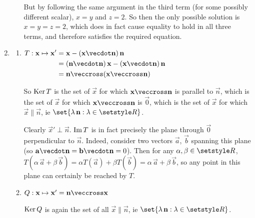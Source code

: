 \documentclass[fleqn,a4paper,11pt]{article}
\begin{document}
\begin{enumerate}[label=\textbf{\arabic*.}]
\begin{enumerate}[label=(\alph*)]
      But by following the same argument in the third term (for some possibly
      different scalar), \(x = y\) and \(z = 2\). So then the only possible
      solution is \(x = y = z = 2\), which does in fact cause equality to hold
      in all three terms, and therefore satisfies the required equation.
    \end{enumerate}
   \item
    \begin{enumerate}[label=(\alph*)]
     \item \(
      \begin{aligned}[t]
       T: \vec x \mapsto \vec x'
        &= \vec x - (\vec x \vecdot \vec n)\,\vec n \\
        &= (\vec n \vecdot \vec n)\,\vec x - (\vec x \vecdot \vec n)\,\vec n \\
        &= \vec n \veccross (\vec x \veccross \vec n)
      \end{aligned} \)

      So \(\operatorname{Ker} T\) is the set of \(\vec x\) for which
      \(\vec x \veccross \vec n\) is parallel to \(\vec n\),
      which is the set of \(\vec x\) for which \(\vec x \veccross \vec n\) is
      \(\vec 0\), which is the set of \(\vec x\) for which
      \(\vec x \parallel \vec n\), ie
      \(\set{\lambda\,\vec n : \lambda \in \Reals}\).

      Clearly \(\vec x' \perp \vec n\). \(\operatorname{Im} T\) is in fact precisely the
      plane through \(\vec 0\) perpendicular to \(\vec n\). Indeed, consider
      two vectors \(\vec a\), \(\vec b\) spanning this plane
      (so \(\vec a \vecdot \vec n = \vec b \vecdot \vec n = 0\)). Then for any
      \(\alpha, \beta \in \Reals\),
      \(T(\alpha\,\vec a + \beta\,\vec b)
        = \alpha T(\vec a) + \beta T(\vec b)
        = \alpha\,\vec a + \beta\,\vec b \),
      so any point in this plane can certainly be reached by \(T\).
     \item
      \(Q: \vec x \mapsto \vec x' = \vec n \veccross \vec x\)

      \(\operatorname{Ker} Q\) is again the set of all \(\vec x \parallel \vec n\),
      ie \(\set{\lambda\,\vec n : \lambda \in \Reals}\).


\end{enumerate}
\end{enumerate}
\end{document}
